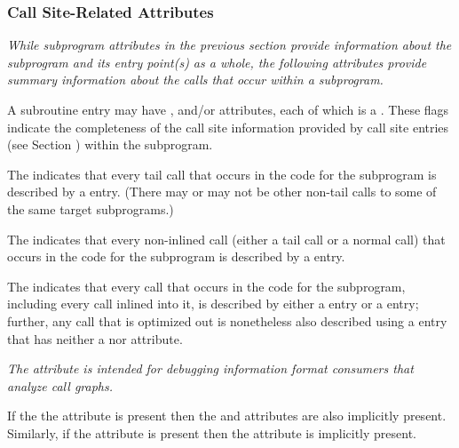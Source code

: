 \subsubsection{Call Site-Related Attributes}
\textit{While subprogram attributes in the previous section provide
information about the subprogram and its entry point(s) as a whole,
the following attributes provide summary information about the calls
that occur within a subprogram.}

A subroutine entry may have \DWATcallalltailcalls,
\DWATcallallcalls{} and/or \DWATcallallsourcecalls{}
attributes, each of which is a \CLASSflag.
These flags indicate the completeness of the call site
information provided by call site entries (see
Section ) within the subprogram.

The \DWATcallalltailcallsDEFN{}
indicates that every tail call
that occurs in the code for the subprogram is described by a
\DWTAGcallsite{} entry.
(There may or may not be other non-tail calls to some of the same
target subprograms.)

The \DWATcallallcallsDEFN{}
indicates that every non-inlined call
(either a tail call or a normal call) that occurs in the code for the subprogram
is described by a \DWTAGcallsite{} entry.

The \DWATcallallsourcecallsDEFN{}
indicates that every call that occurs in the
code for the subprogram, including every call inlined into it, is described by either a
\DWTAGcallsite{} entry or a \DWTAGinlinedsubroutine{} entry; further, any call
that is optimized out is nonetheless also described using a \DWTAGcallsite{} entry
that has neither a \DWATcallpc{} nor \DWATcallreturnpc{} attribute.

\textit{The \DWATcallallsourcecallsNAME{} attribute is intended for debugging
information format consumers that analyze call graphs.}

If the the \DWATcallallsourcecalls{} attribute is present then the
\DWATcallallcalls{} and \DWATcallalltailcalls{} attributes are
also implicitly present. Similarly, if the
\DWATcallallcalls{} attribute is present then the \DWATcallalltailcalls{}
attribute is implicitly present.

